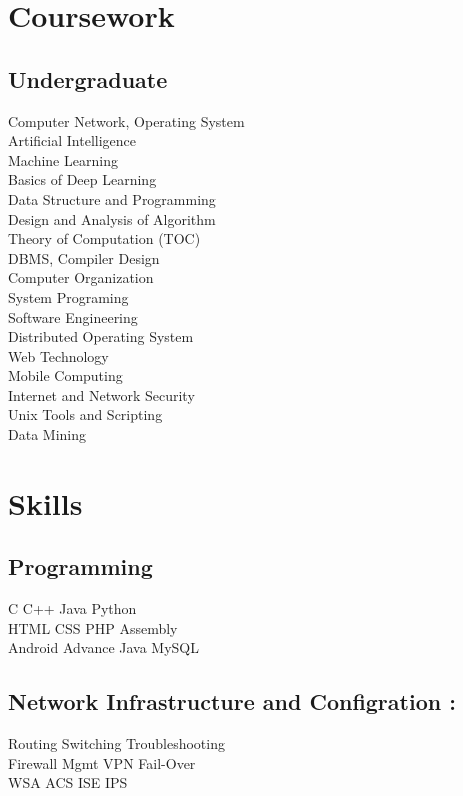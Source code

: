 \documentclass[]{deedy-resume-openfont}
\begin{document}
\begin{minipage}[t]{0.33\textwidth}

\section{Coursework}

\subsection{Undergraduate}
Computer Network, Operating System \\
Artificial Intelligence \\
Machine Learning \\
Basics of Deep Learning \\
Data Structure and Programming \\
Design and Analysis of Algorithm \\
Theory of Computation (TOC) \\
DBMS, Compiler Design  \\
Computer Organization \\
System Programing \\
Software Engineering \\
Distributed Operating System \\
Web Technology \\ 
Mobile Computing \\ 
Internet and Network Security \\
Unix Tools and Scripting \\
Data Mining \\ 



\section{Skills}
\subsection{Programming}
C \textbullet{}   C++ \textbullet{} Java \textbullet{} Python \\
HTML \textbullet{} CSS \textbullet{} PHP \textbullet{} Assembly \\
Android \textbullet{} Advance Java \textbullet{} MySQL

\subsection{Network Infrastructure and Configration :}
Routing \textbullet{} Switching \textbullet{} Troubleshooting\\
Firewall Mgmt \textbullet{} VPN \textbullet{} Fail-Over\\
WSA \textbullet{} ACS \textbullet{} ISE \textbullet{} IPS \\

\end{minipage}
\end{document}

